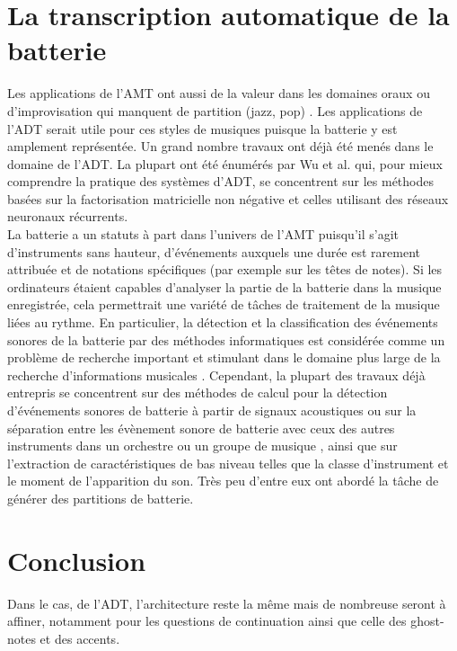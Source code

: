 \section{La transcription automatique de la batterie}
Les applications de l’AMT ont aussi de la valeur dans les domaines oraux ou d’improvisation qui manquent de partition (jazz, pop) \cite{article1}. Les applications de l’ADT serait utile pour ces styles de musiques puisque la batterie y est amplement représentée. Un grand nombre travaux ont déjà été menés dans le domaine de l’ADT. La plupart ont été énumérés par Wu et al. \cite{8350302} qui, pour mieux comprendre la pratique des systèmes d’ADT, se concentrent sur les méthodes basées sur la factorisation matricielle non négative et celles utilisant des réseaux neuronaux récurrents.\\
La batterie a un statuts à part dans l’univers de l’AMT puisqu'il s'agit d'instruments sans hauteur, d'événements auxquels une durée est rarement attribuée et de notations spécifiques (par exemple sur les têtes de notes). Si les ordinateurs étaient capables d'analyser la partie de la batterie dans la musique enregistrée, cela permettrait une variété de tâches de traitement de la musique liées au rythme. En particulier, la détection et la classification des événements sonores de la batterie par des méthodes informatiques est considérée comme un problème de recherche important et stimulant dans le domaine plus large de la recherche d'informations musicales \cite{8350302}. Cependant, la plupart des travaux déjà entrepris se concentrent sur des méthodes de calcul pour la détection d'événements sonores de batterie à partir de signaux acoustiques ou sur la séparation entre les évènement sonore de batterie avec ceux des autres instruments dans un orchestre ou un groupe de musique \cite{2802}, ainsi que sur l'extraction de caractéristiques de bas niveau telles que la classe d'instrument et le moment de l'apparition du son. Très peu d'entre eux ont abordé la tâche de générer des partitions de batterie.
\section{Conclusion}
Dans le cas, de l’ADT, l’architecture reste la même mais de nombreuse seront à affiner, notamment pour les questions de continuation ainsi que celle des ghost-notes et des accents.
